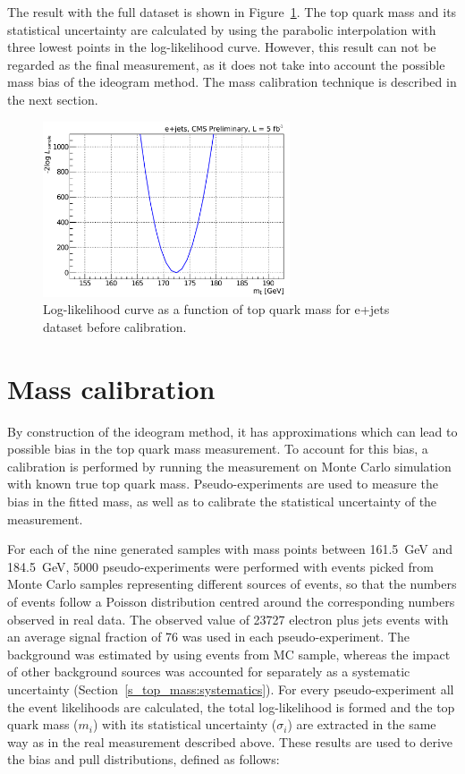 The result with the full dataset is shown in Figure~\ref{fig:LogLikelihood}. The top quark mass and its statistical
uncertainty are calculated by using the parabolic interpolation with three lowest points in the log-likelihood curve.
However, this result can not be regarded as the final measurement, as it does not take into account the possible mass
bias of the ideogram method. The mass calibration technique is described in the next section.

\begin{figure}[!htpb]
\begin{center}
	\includegraphics[width=0.65\textwidth]{Likelihood}
	\caption{\label{fig:LogLikelihood}
	Log-likelihood curve as a function of top quark mass for e+jets dataset before calibration.}
\end{center}
\end{figure}

\section{Mass calibration}
\label{s_top_mass:calibration}
By construction of the ideogram method, it has approximations which can lead to possible bias in the top quark mass
measurement. To account for this bias, a calibration is performed by running the measurement on Monte Carlo simulation
with known true top quark mass. Pseudo-experiments are used to measure the bias in the fitted mass, as well as to
calibrate the statistical uncertainty of the measurement.

For each of the nine generated \ttbar samples with mass points between \SI{161.5}{\GeV} and \SI{184.5}{\GeV},
\num{5000} pseudo-experiments were performed with events picked from Monte Carlo samples representing different sources
of events, so that the numbers of events follow a Poisson distribution centred around the corresponding numbers observed
in real data. The observed value of \num{23727} electron plus jets events with an average signal fraction of
\SI{76}{\pc} was used in each pseudo-experiment. The background was estimated by using events from \WpJets MC sample,
whereas the impact of other background sources was accounted for separately as a systematic uncertainty
(Section~\ref{s_top_mass:systematics}). For every pseudo-experiment all the event likelihoods are calculated, the total
log-likelihood is formed and the top quark mass ($m_i$) with its statistical uncertainty ($\sigma_i$) are extracted in
the same way as in the real measurement described above. These results are used to derive the bias and pull
distributions, defined as follows:

